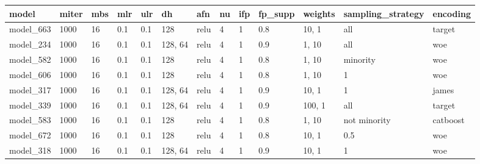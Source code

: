 \begin{tabular}{|l|l|l|l|l|l|l|l|l|l|l|l|l|}
\hline
\textbf{model} & \textbf{miter} & \textbf{mbs} & \textbf{mlr} & \textbf{ulr} & \textbf{dh} & \textbf{afn} & \textbf{nu} & \textbf{ifp} & \textbf{fp\_supp} & \textbf{weights} & \textbf{sampling\_strategy} & \textbf{encoding} \\ \hline
model\_663     & 1000           & 16           & 0.1          & 0.1          & 128         & relu         & 4           & 1            & 0.8               & 10, 1            & all                         & target            \\ \hline
model\_234     & 1000           & 16           & 0.1          & 0.1          & 128, 64     & relu         & 4           & 1            & 0.9               & 1, 10            & all                         & woe               \\ \hline
model\_582     & 1000           & 16           & 0.1          & 0.1          & 128         & relu         & 4           & 1            & 0.8               & 1, 10            & minority                    & woe               \\ \hline
model\_606     & 1000           & 16           & 0.1          & 0.1          & 128         & relu         & 4           & 1            & 0.8               & 1, 10            & 1                           & woe               \\ \hline
model\_317     & 1000           & 16           & 0.1          & 0.1          & 128, 64     & relu         & 4           & 1            & 0.9               & 10, 1            & 1                           & james             \\ \hline
model\_339     & 1000           & 16           & 0.1          & 0.1          & 128, 64     & relu         & 4           & 1            & 0.9               & 100, 1           & all                         & target            \\ \hline
model\_583     & 1000           & 16           & 0.1          & 0.1          & 128         & relu         & 4           & 1            & 0.8               & 1, 10            & not minority                & catboost          \\ \hline
model\_672     & 1000           & 16           & 0.1          & 0.1          & 128         & relu         & 4           & 1            & 0.8               & 10, 1            & 0.5                         & woe               \\ \hline
model\_318     & 1000           & 16           & 0.1          & 0.1          & 128, 64     & relu         & 4           & 1            & 0.9               & 10, 1            & 1                           & woe               \\ \hline

\end{tabular}
